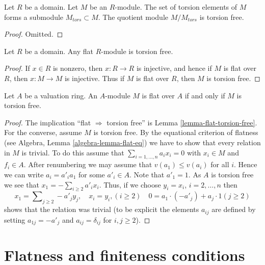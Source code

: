 \begin{lemma}
\label{lemma-torsion}
Let $R$ be a domain. Let $M$ be an $R$-module.
The set of torsion elements of $M$ forms a submodule $M_{tors} \subset M$.
The quotient module $M/M_{tors}$ is torsion free.
\end{lemma}

\begin{proof}
Omitted.
\end{proof}

\begin{lemma}
\label{lemma-flat-torsion-free}
Let $R$ be a domain. Any flat $R$-module is torsion free.
\end{lemma}

\begin{proof}
If $x \in R$ is nonzero, then $x : R \to R$ is injective, and hence if $M$
is flat over $R$, then $x : M \to M$ is injective. Thus if $M$ is flat over
$R$, then $M$ is torsion free.
\end{proof}

\begin{lemma}
\label{lemma-valuation-ring-torsion-free-flat}
Let $A$ be a valuation ring.
An $A$-module $M$ is flat over $A$ if and only if $M$ is torsion free.
\end{lemma}

\begin{proof}
The implication ``flat $\Rightarrow$ torsion free'' is
Lemma \ref{lemma-flat-torsion-free}.
For the converse, assume $M$ is torsion free.
By the equational criterion of flatness (see
Algebra, Lemma \ref{algebra-lemma-flat-eq})
we have to show that every relation in $M$ is trivial. To do this assume that
$\sum_{i = 1, \ldots, n} a_i x_i = 0$ with $x_i \in M$ and $f_i \in A$.
After renumbering we may assume that $v(a_1) \leq v(a_i)$ for all $i$.
Hence we can write $a_i = a'_i a_1$ for some $a'_i \in A$. Note that
$a'_1 = 1$. As $A$ is torsion free we see that
$x_1 = - \sum_{i \geq 2} a'_i x_i$. Thus, if we choose
$y_i = x_i$, $i = 2, \ldots, n$ then
$$
x_1 = \sum\nolimits_{j \geq 2} -a'_j y_j,\quad
x_i = y_i, (i \geq 2)\quad
0 = a_1 \cdot (-a'_j) + a_j \cdot 1 (j \geq 2)
$$
shows that the relation was trivial (to be explicit the elements
$a_{ij}$ are defined by setting $a_{1j} = -a'_j$ and $a_{ij} = \delta_{ij}$
for $i, j \geq 2$).
\end{proof}






\section{Flatness and finiteness conditions}
\label{section-flat-finite}

